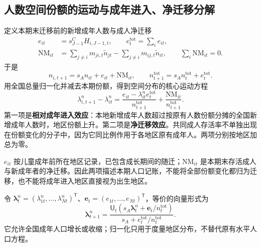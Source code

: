 \documentclass[UTF8,a4paper,zihao=-4,fontset=windows]{ctexart}
\numberwithin{equation}{section}
\begin{document}
\subsection{人数空间份额的运动与成年进入、净迁移分解}
定义本期末迁移前的新增成年人数与成人净迁移
\begin{align}
 e_{it}&=s^C_{J-1}H_{i,J-1,t},\qquad
 e_t^{\mathrm{tot}}=\sum_ie_{it},\\
 \mathrm{NM}_{it}&=\sum_{j\neq i}m_{ji,t}\widetilde n_{jt}
 -\sum_{j\neq i}m_{ij,t}\widetilde n_{it},\qquad
 \sum_i\mathrm{NM}_{it}=0.
 \label{eq:lg-entrant-net-migration}
\end{align}
于是
\begin{equation}
 n_{i,t+1}=s_An_{it}+e_{it}+\mathrm{NM}_{it},\qquad
 n_{t+1}^{\mathrm{tot}}=s_An_t^{\mathrm{tot}}+e_t^{\mathrm{tot}}.
\end{equation}
用全国总量归一化并减去本期份额，得到空间分布的核心运动方程
\begin{equation}
 \lambda^n_{i,t+1}-\lambda^n_{it}
 =\frac{e_{it}-\lambda^n_{it}e_t^{\mathrm{tot}}}
 {n_{t+1}^{\mathrm{tot}}}
 +\frac{\mathrm{NM}_{it}}{n_{t+1}^{\mathrm{tot}}}.
 \label{eq:lg-spatial-share-law}
\end{equation}
第一项是\textbf{相对成年进入效应}：本地新增成年人数超过按原有人数份额分摊的全国新增成年人数时，地区份额上升。第二项是\textbf{净迁移效应}。共同成人存活率不单独出现在份额变化的分子中，因为它同比例作用于各地区原有成年人。两项分别按地区加总为零。

$e_{it}$ 按儿童成年前所在地区记录，已包含成长期间的随迁；$\mathrm{NM}_{it}$ 是本期末存活成人与新成年者的净迁移。因此两项描述本期人口记账，不能将全部份额变化都归为迁移，也不能将成年进入地区直接视为出生地区。

令 $\bm\lambda^n_t=(\lambda^n_{1t},\ldots,\lambda^n_{Nt})^{\mathsf T}$、$\bm e_t=(e_{1t},\ldots,e_{Nt})^{\mathsf T}$，等价的向量形式为
\begin{equation}
 \bm\lambda^n_{t+1}
 =\frac{\mathsf U_t\left(s_A\bm\lambda^n_t+\bm e_t/n_t^{\mathrm{tot}}\right)}
 {s_A+e_t^{\mathrm{tot}}/n_t^{\mathrm{tot}}}.
 \label{eq:lg-vector-share-law}
\end{equation}
它允许全国成年人口增长或收缩；归一化只用于度量地区分布，不替代原有水平人口方程。
\end{document}
